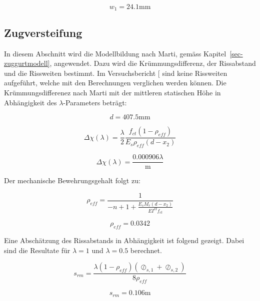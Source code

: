 \documentclass[
  12pt,
  letterpaper,
  egregdoesnotlikesansseriftitles]{scrreprt}
\begin{document}
\begin{equation}w_{1} = 24.1 \text{mm}\end{equation}

\subsection{Zugversteifung}\label{zugversteifung-1}

In diesem Abschnitt wird die Modellbildung nach Marti, gemäss
Kapitel~\ref{sec-zuggurtmodell}, angewendet. Dazu wird die
Krümmungsdifferenz, der Rissabstand und die Rissweiten bestimmt. Im
Versuchsbericht {[}\citeproc{ref-Tue2019}{2}{]} sind keine Rissweiten
aufgeführt, welche mit den Berechnungen verglichen werden können. Die
Krümmungsdifferenez nach Marti mit der mittleren statischen Höhe in
Abhängigkeit des \(\lambda\)-Parameters beträgt:

\begin{equation}d = 407.5 \text{mm}\end{equation}

\begin{equation}\Delta\chi{\left(\lambda \right)} = \frac{\lambda}{2} \frac{f_{ct} \left(1 - \rho_{eff}\right)}{E_{s} \rho_{eff} \left(d - x_{2}\right)}\end{equation}

\begin{equation}\Delta\chi{\left(\lambda \right)} = \frac{0.000906 \lambda}{\text{m}}\end{equation}

Der mechanische Bewehrungsgehalt folgt zu:

\begin{equation}\rho_{eff} = \frac{1}{- n + 1 + \frac{E_{s} M_{r} \left(d - x_{2}\right)}{EI^{II} f_{ct}}}\end{equation}

\begin{equation}\rho_{eff} = 0.0342\end{equation}

Eine Abschätzung des Rissabstands in Abhängigkeit ist folgend gezeigt.
Dabei sind die Resultate für \(\lambda = 1\) und \(\lambda = 0.5\)
berechnet.

\begin{equation}s_{rm} = \frac{\lambda \left(1 - \rho_{eff}\right) \left(\oslash_{s,1} + \oslash_{s,2}\right)}{8 \rho_{eff}}\end{equation}

\begin{equation}s_{rm} = 0.106 \text{m}\end{equation}
\end{document}
